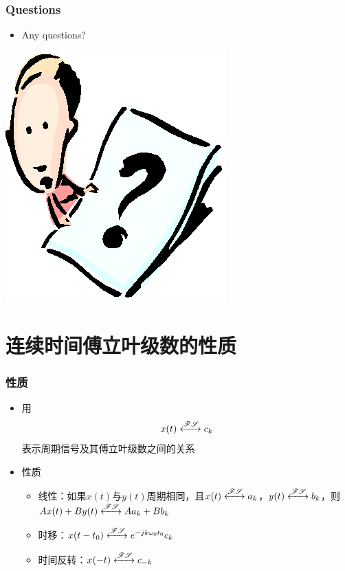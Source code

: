 \documentclass[CJKutf8,xcolor=pdftex,dvipsnames,table]{beamer}
\begin{document}
\begin{CJK*}{UTF8}{song}
  \begin{frame}
    \frametitle{Questions}
    \begin{itemize}
    \item Any questions?
    \end{itemize}
    \begin{center}
      \includegraphics[scale=.5]{question}
    \end{center}
  \end{frame}  
  
  \section{连续时间傅立叶级数的性质}  
  
  \begin{frame}
    \frametitle{性质}
    \begin{itemize}
    \item 用
    \[ x(t) \xleftrightarrow{\mathscr{FS}} c_k \]
    表示周期信号及其傅立叶级数之间的关系    
    \item 性质
    	\begin{itemize}
    	\item 线性：如果$x(t)$与$y(t)$周期相同，且$x(t) \xleftrightarrow{\mathscr{FS}} a_k$，$y(t) \xleftrightarrow{\mathscr{FS}} b_k$，则$Ax(t)+By(t) \xleftrightarrow{\mathscr{FS}} Aa_k+Bb_k$
    	\item 时移：$x(t-t_0) \xleftrightarrow{\mathscr{FS}} e^{-jk\omega_0 t_0} c_k $
		\item 时间反转：$x(-t) \xleftrightarrow{\mathscr{FS}} c_{-k} $
    	\end{itemize}
	\end{itemize}
  \end{frame}  
    

\end{CJK*}
\end{document}
